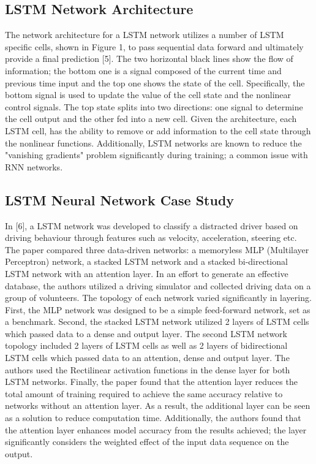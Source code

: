 \documentclass[journal]{IEEEtran}
\begin{document}
\subsection{LSTM Network Architecture}

The network architecture for a LSTM network utilizes a number of LSTM specific cells, shown in Figure 1,  to pass sequential data forward and ultimately provide a final prediction [5]. The two horizontal black lines show the flow of information; the bottom one is a signal composed of the current time and previous time input and the top one shows the state of the cell. Specifically, the bottom signal is used to update the value of the cell state and the nonlinear control signals. The top state splits into two directions: one signal to determine the cell output and the other fed into a new cell. Given the architecture, each LSTM cell, has the ability to remove or add information to the cell state through the nonlinear functions. Additionally, LSTM networks are known to reduce the "vanishing gradients" problem significantly during training; a common issue with RNN networks. 


\subsection{LSTM Neural Network Case Study}

In [6], a LSTM network was developed to classify a distracted driver based on driving behaviour through features such as velocity, acceleration, steering etc. The paper compared three data-driven networks: a memoryless MLP (Multilayer Perceptron) network, a stacked LSTM network and a stacked bi-directional LSTM network with an attention layer. In an effort to generate an effective database, the authors utilized a driving simulator and collected driving data on a group of volunteers. The topology of each network varied significantly in layering. First, the MLP network was designed to be a simple feed-forward network, set as a benchmark. Second, the stacked LSTM network utilized 2 layers of LSTM cells which passed data to a dense and output layer. The second LSTM network topology included 2 layers of LSTM cells as well as 2 layers of bidirectional LSTM cells which passed data to an attention, dense and output layer. The authors used the Rectilinear activation functions in the dense layer for both LSTM networks. Finally, the paper found that the attention layer reduces the total amount of training required to achieve the same accuracy relative to networks without an attention layer. As a result, the additional layer can be seen as a solution to reduce computation time. Additionally, the authors found that the attention layer enhances model accuracy from the results achieved; the layer significantly considers the weighted effect of the input data sequence on the output. 
\end{document}
